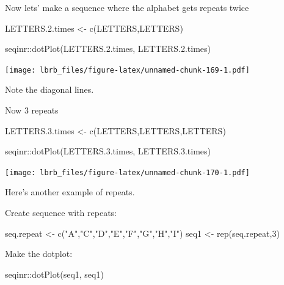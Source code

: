 \documentclass[
]{book}
\newenvironment{Shaded}{\begin{snugshade}}{\end{snugshade}}
\newcommand{\DecValTok}[1]{\textcolor[rgb]{0.00,0.00,0.81}{#1}}
\newcommand{\FloatTok}[1]{\textcolor[rgb]{0.00,0.00,0.81}{#1}}
\newcommand{\FunctionTok}[1]{\textcolor[rgb]{0.00,0.00,0.00}{#1}}
\newcommand{\NormalTok}[1]{#1}
\newcommand{\OtherTok}[1]{\textcolor[rgb]{0.56,0.35,0.01}{#1}}
\newcommand{\SpecialCharTok}[1]{\textcolor[rgb]{0.00,0.00,0.00}{#1}}
\newcommand{\StringTok}[1]{\textcolor[rgb]{0.31,0.60,0.02}{#1}}
\begin{document}
Now lets' make a sequence where the alphabet gets repeats twice

\begin{Shaded}
\begin{Highlighting}[]
\NormalTok{LETTERS.}\FloatTok{2.}\NormalTok{times }\OtherTok{\textless{}{-}} \FunctionTok{c}\NormalTok{(LETTERS,LETTERS)}

\NormalTok{seqinr}\SpecialCharTok{::}\FunctionTok{dotPlot}\NormalTok{(LETTERS.}\FloatTok{2.}\NormalTok{times, }
\NormalTok{                LETTERS.}\FloatTok{2.}\NormalTok{times)}
\end{Highlighting}
\end{Shaded}

\texttt{[image: lbrb\_files/figure-latex/unnamed-chunk-169-1.pdf]}

Note the diagonal lines.

Now 3 repeats

\begin{Shaded}
\begin{Highlighting}[]
\NormalTok{LETTERS.}\FloatTok{3.}\NormalTok{times }\OtherTok{\textless{}{-}} \FunctionTok{c}\NormalTok{(LETTERS,LETTERS,LETTERS)}

\NormalTok{seqinr}\SpecialCharTok{::}\FunctionTok{dotPlot}\NormalTok{(LETTERS.}\FloatTok{3.}\NormalTok{times, }
\NormalTok{                LETTERS.}\FloatTok{3.}\NormalTok{times)}
\end{Highlighting}
\end{Shaded}

\texttt{[image: lbrb\_files/figure-latex/unnamed-chunk-170-1.pdf]}

Here's another example of repeats.

Create sequence with repeats:

\begin{Shaded}
\begin{Highlighting}[]
\NormalTok{seq.repeat }\OtherTok{\textless{}{-}} \FunctionTok{c}\NormalTok{(}\StringTok{"A"}\NormalTok{,}\StringTok{"C"}\NormalTok{,}\StringTok{"D"}\NormalTok{,}\StringTok{"E"}\NormalTok{,}\StringTok{"F"}\NormalTok{,}\StringTok{"G"}\NormalTok{,}\StringTok{"H"}\NormalTok{,}\StringTok{"I"}\NormalTok{)}
\NormalTok{seq1 }\OtherTok{\textless{}{-}} \FunctionTok{rep}\NormalTok{(seq.repeat,}\DecValTok{3}\NormalTok{)}
\end{Highlighting}
\end{Shaded}

Make the dotplot:

\begin{Shaded}
\begin{Highlighting}[]
\NormalTok{seqinr}\SpecialCharTok{::}\FunctionTok{dotPlot}\NormalTok{(seq1, }
\NormalTok{                seq1)}
\end{Highlighting}
\end{Shaded}
\end{document}
